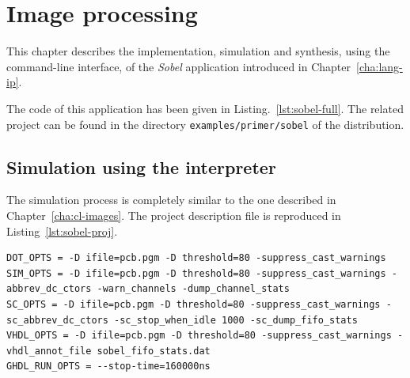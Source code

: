 
\chapter{Image processing}
\label{cha:cl-ip}

This chapter describes the implementation, simulation and synthesis, using the command-line
interface, of the \emph{Sobel} application introduced in Chapter~\ref{cha:lang-ip}. 

The code of this application has been given in Listing.~\ref{lst:sobel-full}. The related project
can be found in the directory \verb|examples/primer/sobel| of the distribution.

\section{Simulation using the interpreter}
\label{sec:simulation-3}

The simulation process is completely similar to the one described in Chapter~\ref{cha:cl-images}.
The project description file is reproduced in Listing~\ref{lst:sobel-proj}.

\begin{lstlisting}[style=MakeStyle,caption={Project file for the program of in Listing.~\ref{lst:sobel-full}},label={lst:sobel-proj}]
DOT_OPTS = -D ifile=pcb.pgm -D threshold=80 -suppress_cast_warnings
SIM_OPTS = -D ifile=pcb.pgm -D threshold=80 -suppress_cast_warnings -abbrev_dc_ctors -warn_channels -dump_channel_stats
SC_OPTS = -D ifile=pcb.pgm -D threshold=80 -suppress_cast_warnings -sc_abbrev_dc_ctors -sc_stop_when_idle 1000 -sc_dump_fifo_stats
VHDL_OPTS = -D ifile=pcb.pgm -D threshold=80 -suppress_cast_warnings -vhdl_annot_file sobel_fifo_stats.dat
GHDL_RUN_OPTS = --stop-time=160000ns
\end{lstlisting}

